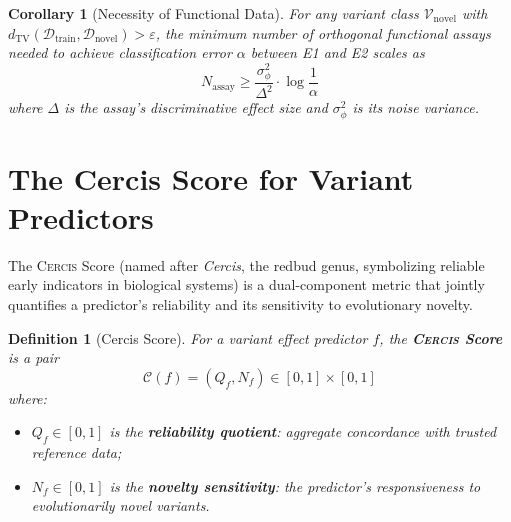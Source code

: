 \documentclass[11pt,a4paper]{article}
\newtheorem{corollary}[theorem]{Corollary}
\newtheorem{definition}[theorem]{Definition}
\theoremstyle{definition}
\newcommand{\calD}{\mathcal{D}}
\newcommand{\calV}{\mathcal{V}}
\newcommand{\cercis}{\textsc{Cercis}}
\newcommand{\cercisscore}{\mathcal{C}}
\begin{document}
\begin{corollary}[Necessity of Functional Data]
\label{cor:necessity-functional}
For any variant class $\calV_{\text{novel}}$ with $d_{\text{TV}}(\calD_{\text{train}}, \calD_{\text{novel}}) > \varepsilon$, the minimum number of orthogonal functional assays needed to achieve classification error $\alpha$ between E1 and E2 scales as
\begin{equation}
    N_{\text{assay}} \geq \frac{\sigma_\phi^2}{\Delta^2} \cdot \log\frac{1}{\alpha}
\end{equation}
where $\Delta$ is the assay's discriminative effect size and $\sigma_\phi^2$ is its noise variance.
\end{corollary}
\section{The Cercis Score for Variant Predictors}
\label{sec:cercis}
The \cercis{} Score (named after \textit{Cercis}, the redbud genus, symbolizing reliable early indicators in biological systems) is a dual-component metric that jointly quantifies a predictor's reliability and its sensitivity to evolutionary novelty.
\begin{definition}[Cercis Score]
\label{def:cercis}
For a variant effect predictor $f$, the \textbf{\cercis{} Score} is a pair
\begin{equation}
    \cercisscore(f) = (Q_f, N_f) \in [0,1] \times [0,1]
\end{equation}
where:
\begin{itemize}[leftmargin=*]
    \item $Q_f \in [0,1]$ is the \textbf{reliability quotient}: aggregate concordance with trusted reference data;
    \item $N_f \in [0,1]$ is the \textbf{novelty sensitivity}: the predictor's responsiveness to evolutionarily novel variants.
\end{itemize}
\end{definition}
\end{document}
